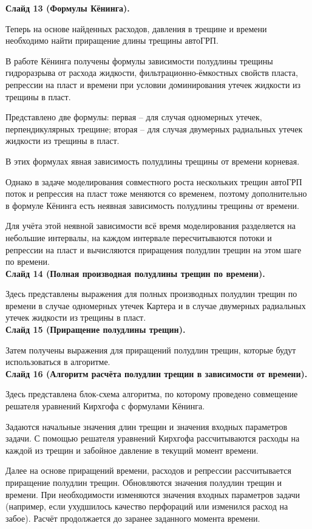 \documentclass[a4paper, 12pt]{article}
\begin{document}
\textbf{Слайд 13 (Формулы Кёнинга).}

Теперь на основе найденных расходов, давления в трещине и времени необходимо найти приращение длины трещины автоГРП.

В работе Кёнинга получены формулы зависимости полудлины трещины гидроразрыва от расхода жидкости, фильтрационно-ёмкостных свойств пласта, репрессии на пласт и времени при условии доминирования утечек жидкости из трещины в пласт.

Представлено две формулы: первая -- для случая одномерных утечек, перпендикулярных трещине; вторая -- для случая двумерных радиальных утечек жидкости из трещины в пласт.

В этих формулах явная зависимость полудлины трещины от времени корневая.

Однако в задаче моделирования совместного роста нескольких трещин автоГРП поток и репрессия на пласт тоже меняются со временем, поэтому дополнительно в формуле Кёнинга есть неявная зависимость полудлины трещины от времени.

Для учёта этой неявной зависимости всё время моделирования разделяется на небольшие интервалы, на каждом интервале пересчитываются потоки и репрессии на пласт и вычисляются приращения полудлин трещин на этом шаге по времени.
\\


\textbf{Слайд 14 (Полная производная полудлины трещин по времени).}

Здесь представлены выражения для полных производных полудлин трещин по времени в случае одномерных утечек Картера и в случае двумерных радиальных утечек жидкости из трещины в пласт.
\\


\textbf{Слайд 15 (Приращение полудлины трещин).}

Затем получены выражения для приращений полудлин трещин, которые будут использоваться в алгоритме.
\\


\textbf{Слайд 16 (Алгоритм расчёта полудлин трещин в зависимости от времени).}

Здесь представлена блок-схема алгоритма, по которому проведено совмещение решателя уравнений Кирхгофа с формулами Кёнинга.

Задаются начальные значения длин трещин и значения входных параметров задачи.
С помощью решателя уравнений Кирхгофа рассчитываются расходы на каждой из трещин и забойное давление в текущий момент времени.

Далее на основе приращений времени, расходов и репрессии рассчитывается приращение полудлин трещин.
Обновляются значения полудлин трещин и времени.
При необходимости изменяются значения входных параметров задачи (например, если ухудшилось качество перфораций или изменился расход на забое).
Расчёт продолжается до заранее заданного момента времени.
\\
\end{document}
